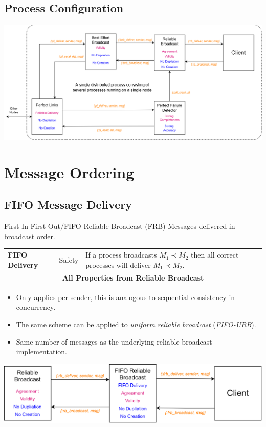 \subsection{Process Configuration}
\begin{center}
    \includegraphics[width=\textwidth]{broadcast/images/process_config.drawio.png}
\end{center}


\section{Message Ordering}
\subsection{FIFO Message Delivery}
\begin{definitionbox}{First In First Out/FIFO Reliable Broadcast (FRB)}
    Messages delivered in broadcast order.
    \begin{center}
        \begin{tabular}{l l p{}}
            \textbf{FIFO Delivery} & Safety & If a process broadcasts $M_1 \prec M_2$ then all correct processes will deliver $M_1 \prec M_2$. \\
            \multicolumn{3}{c}{\textbf{All Properties from Reliable Broadcast}} \\
        \end{tabular}
    \end{center}
    \begin{itemize}
        \item Only applies per-sender, this is analogous to sequential consistency in concurrency.
        \item The same scheme can be applied to \textit{uniform reliable broadcast} (\textit{FIFO-URB}).
        \item Same number of messages as the underlying reliable broadcast implementation.
    \end{itemize}
\end{definitionbox}
\begin{center}
    \includegraphics[width=.8\textwidth]{broadcast/images/fifo_reliable_broadcast.drawio.png}
\end{center}
\inputminted{elixir}{broadcast/code/fifo_reliable_broadcast.ex}

